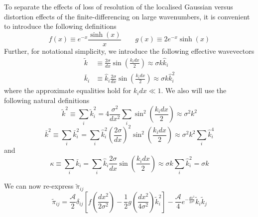 \documentclass{revtex4}
\begin{document}
To separate the effects of loss of resolution of the localised Gaussian versus distortion effects of the finite-differencing on large wavenumbers, it is convenient to introduce the following definitions
\begin{equation}
  f(x) \equiv e^{-x}\frac{\sinh(x)}{x} \qquad g(x) \equiv 2e^{-x}\sinh(x)
\end{equation}
Further, for notational simplicity, we introduce the following effective wavevectors
\begin{subequations}
\begin{align}
  \tilde{k} &\equiv \frac{2\sigma}{dx}\sin\left(\frac{k_idx}{2}\right) \approx \sigma k\hat{k}_i \\
  \bar{k}_i &\equiv \hat{k}_i\frac{2\sigma}{dx}\sin\left(\frac{k_idx}{2}\right) \approx \sigma k\hat{k}_i^2
\end{align}
\end{subequations}
where the approximate equalities hold for $k_idx \ll 1$.
We also will use the following natural definitions
\begin{equation}
  \tilde{k}^2 \equiv \sum_i\tilde{k}_i^2 = 4\frac{\sigma^2}{dx^2}\sum_i\sin^2\left(\frac{k_idx}{2}\right) \approx \sigma^2k^2
\end{equation}
\begin{equation}
  \bar{k}^2 \equiv \sum_i\bar{k}_i^2 = \sum_i \hat{k}_i^2\left(\frac{2\sigma}{dx}\right)^2\sin^2\left(\frac{k_idx}{2}\right) \approx \sigma^2k^2\sum_i\hat{k}_i^4
\end{equation}
and
\begin{equation}
  \kappa \equiv \sum_i\bar{k}_i = \sum_i\hat{k}_i\frac{2\sigma}{dx}\sin\left(\frac{k_idx}{2}\right) \approx \sigma k\sum_i\hat{k}_i^2 = \sigma k
\end{equation}

We can now re-express $\tilde{\pi}_{ij}$
\begin{equation}
  \tilde{\pi}_{ij} = \frac{\mathcal{A}}{2}\delta_{ij}\left[f\left(\frac{dx^2}{2\sigma^2}\right) - \frac{1}{2}g\left(\frac{dx^2}{4\sigma^2}\right)\tilde{k}_i^2\right] - \frac{\mathcal{A}}{4}e^{-\frac{dx^2}{2\sigma^2}}\tilde{k}_i\tilde{k}_j
\end{equation}
\end{document}
